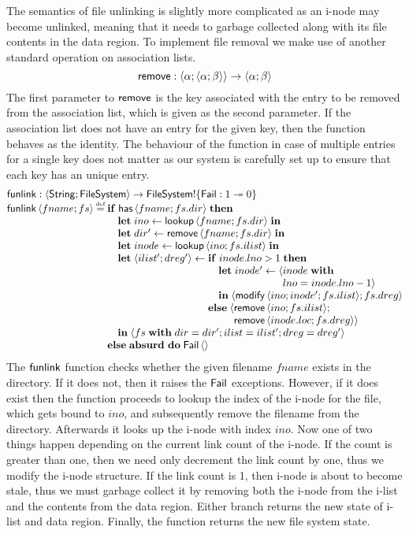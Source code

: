 \documentclass[12pt,phd,lfcs,twoside,openright,logo,leftchapter,normalheadings]{infthesis}
\theoremstyle{plain}
\theoremstyle{definition}
\begin{document}
The semantics of file unlinking is slightly more complicated as an
i-node may become unlinked, meaning that it needs to garbage collected
along with its file contents in the data region. To implement file
removal we make use of another standard operation on association
lists.
%
\[
  \mathsf{remove} : \langle \alpha;\langle \alpha;\beta \rangle \rangle \to \langle \alpha;\beta \rangle
\]
%
The first parameter to $\mathsf{remove}$ is the key associated with the entry
to be removed from the association list, which is given as the second
parameter. If the association list does not have an entry for the
given key, then the function behaves as the identity. The behaviour of
the function in case of multiple entries for a single key does not
matter as our system is carefully set up to ensure that each key has
an unique entry.
%
\[
  \bl
    \funlink : \Record{\String;\FileSystem} \to \FileSystem \eff \{\Fail : \UnitType \opto \ZeroType\}\\
    \funlink\,\Record{fname;fs} \defas
      \bl
        \If\;\dec{has}\,\Record{fname;fs.dir}\;\Then\\
        \quad
          \bl
            \Let\;ino \revto \lookup\,\Record{fname;fs.dir}\;\In\\
            \Let\;dir' \revto \remove\,\Record{fname;fs.dir}\;\In\\
            \Let\;inode \revto \lookup\,\Record{ino;fs.ilist}\;\In\\
            \Let\;\Record{ilist';dreg'} \revto
               \bl
                  \If\;inode.lno > 1\;\Then\\
                   \quad\bl
                      \Let\;inode' \revto \Record{\bl inode\;\With\\lno = inode.lno - 1}\el\\
                      \In\;\Record{\modify\,\Record{ino;inode';fs.ilist};fs.dreg}
                    \el\\
                  \Else\;
                       \Record{\bl\remove\,\Record{ino;fs.ilist};\\
                       \remove\,\Record{inode.loc;fs.dreg}}
                    \el
                  \el\\
            \In\;\Record{fs\;\With\;dir = dir'; ilist = ilist'; dreg = dreg'}
          \el\\
        \Else\; \Absurd~\Do\;\Fail\,\Unit
      \el
  \el
\]
%
The $\mathsf{funlink}$ function checks whether the given filename $fname$
exists in the directory. If it does not, then it raises the $\mathsf{Fail}$
exceptions. However, if it does exist then the function proceeds to
lookup the index of the i-node for the file, which gets bound to
$ino$, and subsequently remove the filename from the
directory. Afterwards it looks up the i-node with index $ino$. Now one
of two things happen depending on the current link count of the
i-node. If the count is greater than one, then we need only decrement
the link count by one, thus we modify the i-node structure. If the
link count is 1, then i-node is about to become stale, thus we must
garbage collect it by removing both the i-node from the i-list and the
contents from the data region. Either branch returns the new state of
i-list and data region. Finally, the function returns the new file
system state.
\end{document}
